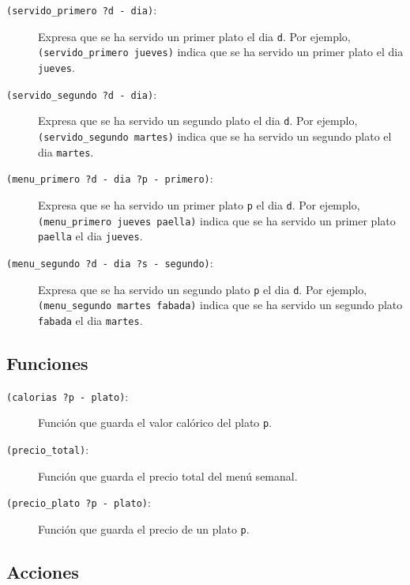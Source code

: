 \begin{description}
  \item[\texttt{(servido\_primero ?d - dia)}:]

    Expresa que 
    se ha servido un primer plato el dia \texttt{d}.
    Por ejemplo, \texttt{(servido\_primero jueves)} indica que
    se ha servido un primer plato el dia \texttt{jueves}.

  \item[\texttt{(servido\_segundo ?d - dia)}:]

    Expresa que 
    se ha servido un segundo plato el dia \texttt{d}.
    Por ejemplo, \texttt{(servido\_segundo martes)} indica que
    se ha servido un segundo plato el dia \texttt{martes}.

  \item[\texttt{(menu\_primero ?d - dia ?p - primero)}:]

    Expresa que 
    se ha servido un primer plato \texttt{p} el dia \texttt{d}.
    Por ejemplo, \texttt{(menu\_primero jueves paella)} indica que
    se ha servido un primer plato \texttt{paella} el dia \texttt{jueves}.

  \item[\texttt{(menu\_segundo ?d - dia ?s - segundo)}:]

    Expresa que 
    se ha servido un segundo plato \texttt{p} el dia \texttt{d}.
    Por ejemplo, \texttt{(menu\_segundo martes fabada)} indica que
    se ha servido un segundo plato \texttt{fabada} el dia \texttt{martes}.

\end{description}

\subsection{Funciones}

\begin{description}
  \item[\texttt{(calorias ?p - plato)}:]
    Función que guarda el valor calórico del plato \texttt{p}.
  \item[\texttt{(precio\_total)}:]
    Función que guarda el precio total del menú semanal.
  \item[\texttt{(precio\_plato ?p - plato)}:]
    Función que guarda el precio de un plato \texttt{p}.
\end{description}

\subsection{Acciones}

